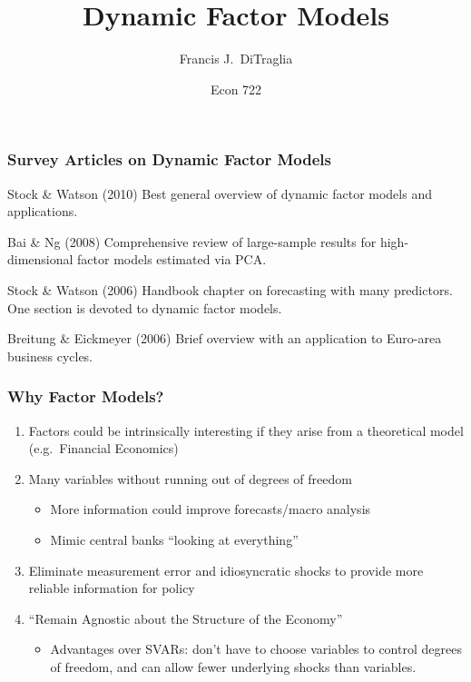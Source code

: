\documentclass[handout]{beamer}
\title[Econ 722]{Dynamic Factor Models}
\author[F. DiTraglia]{Francis J.\ DiTraglia}
\institute{University of Pennsylvania}
\date{Econ 722}
\begin{document}
 



\begin{frame}[plain]
	\titlepage 
	

\end{frame} 


\begin{frame}
\frametitle{Survey Articles on Dynamic Factor Models}

\begin{block}
	{Stock \& Watson (2010)}
	Best general overview of dynamic factor models and applications.
\end{block}

\begin{block}
	{Bai \& Ng (2008)}
Comprehensive review of large-sample results for high-dimensional factor models estimated via PCA.
\end{block}

\begin{block}
	{Stock \& Watson (2006)}
	Handbook chapter on forecasting with many predictors. One section is devoted to dynamic factor models.
\end{block}

\begin{block}
	{Breitung \& Eickmeyer (2006)}
	Brief overview with an application to Euro-area business cycles. 
\end{block}

\end{frame}
\begin{frame}[c]\frametitle{Why Factor Models?}
   
\begin{enumerate}
	\item Factors could be intrinsically interesting if they arise from a theoretical model (e.g.\ Financial Economics)
	\item Many variables without running out of degrees of freedom\begin{itemize}
			\item More information could improve forecasts/macro analysis
			\item Mimic central banks ``looking at everything'' 
		\end{itemize}
	\item Eliminate measurement error and idiosyncratic shocks to provide more reliable information for policy
	\item ``Remain Agnostic about the Structure of the Economy''\begin{itemize}
		\item Advantages over SVARs: don't have to choose variables to control degrees of freedom, and can allow fewer underlying shocks than variables. 
	\end{itemize}
\end{enumerate}


\end{frame}
\end{document}
